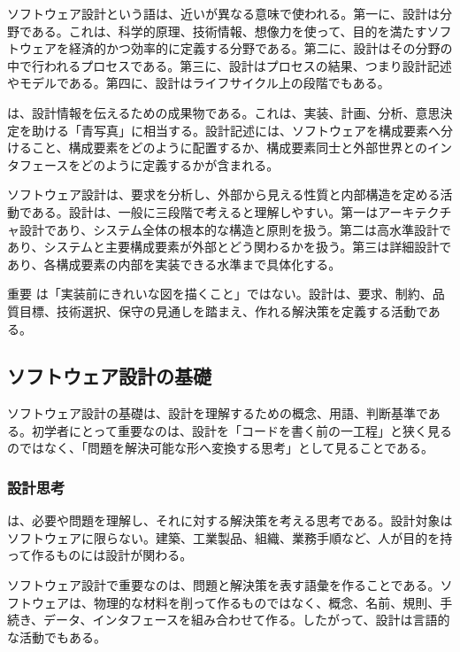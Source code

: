 \documentclass[a4paper,11pt]{ltjsarticle}
\numberwithin{figure}{section}
\numberwithin{table}{section}
\begin{document}
ソフトウェア設計という語は、近いが異なる意味で使われる。第一に、設計は分野である。これは、科学的原理、技術情報、想像力を使って、目的を満たすソフトウェアを経済的かつ効率的に定義する分野である。第二に、設計はその分野の中で行われるプロセスである。第三に、設計はプロセスの結果、つまり設計記述やモデルである。第四に、設計はライフサイクル上の段階でもある。

 は、設計情報を伝えるための成果物である。これは、実装、計画、分析、意思決定を助ける「青写真」に相当する。設計記述には、ソフトウェアを構成要素へ分けること、構成要素をどのように配置するか、構成要素同士と外部世界とのインタフェースをどのように定義するかが含まれる。

ソフトウェア設計は、要求を分析し、外部から見える性質と内部構造を定める活動である。設計は、一般に三段階で考えると理解しやすい。第一はアーキテクチャ設計であり、システム全体の根本的な構造と原則を扱う。第二は高水準設計であり、システムと主要構成要素が外部とどう関わるかを扱う。第三は詳細設計であり、各構成要素の内部を実装できる水準まで具体化する。

\begin{pointbox}{重要}
は「実装前にきれいな図を描くこと」ではない。設計は、要求、制約、品質目標、技術選択、保守の見通しを踏まえ、作れる解決策を定義する活動である。
\end{pointbox}

\subsection{ソフトウェア設計の基礎}

ソフトウェア設計の基礎は、設計を理解するための概念、用語、判断基準である。初学者にとって重要なのは、設計を「コードを書く前の一工程」と狭く見るのではなく、「問題を解決可能な形へ変換する思考」として見ることである。

\subsubsection{設計思考}

 は、必要や問題を理解し、それに対する解決策を考える思考である。設計対象はソフトウェアに限らない。建築、工業製品、組織、業務手順など、人が目的を持って作るものには設計が関わる。

ソフトウェア設計で重要なのは、問題と解決策を表す語彙を作ることである。ソフトウェアは、物理的な材料を削って作るものではなく、概念、名前、規則、手続き、データ、インタフェースを組み合わせて作る。したがって、設計は言語的な活動でもある。
\end{document}
